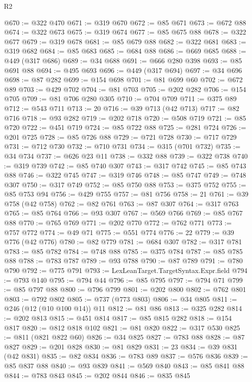\begin{lexlean}{R2}
\begin{coremodule}
@670 := @322 @470
@671 := @319 @670
@672 := @85 @671
@673 := @672 @88
@674 := @322 @673
@675 := @319 @674
@677 := @85 @675 @88
@678 := @322 @677
@679 := @319 @678
@681 := @85 @679 @88
@682 := @322 @681
@683 := @319 @682
@684 := @85 @683
@685 := @684 @88
@686 := @669 @685
@688 := @449 (@317 @686)
@689 := @34 @688
@691 := @666 @280 @398
@693 := @85 @691 @88
@694 := @495 @693
@696 := @449 (@317 @694)
@697 := @34 @696
@698 := @87 @282
@699 := @154 @698
@701 := @81 @699 @60
@702 := @672 @89
@703 := @429 @702
@704 := @81 @703
@705 := @202 @282
@706 := @154 @705
@709 := @81 @706 @280 @305
@710 := @704 @709
@711 := @375 @89
@712 := @543 @711
@713 := 20
@716 := @39 @713 (@42 @713)
@717 := @82 @716
@718 := @93 @282
@719 := @202 @718
@720 := @508 @719
@721 := @85 @720
@722 := @451 @719
@724 := @85 @722 @88
@725 := @281 @724
@726 := @201 @725
@728 := @85 @726 @88
@729 := @721 @728
@730 := @717 @729
@731 := @712 @730
@732 := @710 @731
@734 := @315 (@701 @732)
@735 := @34 @734
@737 := @626 @23 @11
@738 := @332 @88
@739 := @322 @738
@740 := @319 @739
@742 := @85 @740 @307
@743 := @317 @742
@745 := @85 @743 @88
@746 := @322 @745
@747 := @319 @746
@748 := @85 @747
@749 := @748 @307
@750 := @317 @749
@752 := @85 @750 @88
@753 := @375 @752
@755 := @85 @753 @94
@756 := @429 @755
@757 := @81 @756
@758 := 21
@761 := @39 @758 (@42 @758)
@762 := @82 @761
@763 := @87 @307
@764 := @317 @763
@765 := @85 @764
@766 := @93 @307
@767 := @569 @766
@769 := @85 @767 @88
@770 := @765 @769
@771 := @202 @770
@772 := @762 @771
@773 := @757 @772
@774 := @49 @71
@775 := @551 @774
@776 := 22
@779 := @39 @776 (@42 @776)
@780 := @82 @779
@781 := @684 @307
@782 := @317 @781
@783 := @85 @782
@784 := @748 @88
@785 := @375 @784
@787 := @85 @785 @88
@788 := @783 @787
@789 := @93 @788
@790 := @87 @789
@791 := @780 @790
@792 := @775 @791
@793 := LexLeanTarget.TargetSyntax.Expr.field
@794 := @793 @140
@795 := @794 @44
@796 := @85 @795
@797 := @794 @71
@799 := @85 @797 @88
@800 := @796 @799
@801 := @202 @800
@802 := @762 @801
@803 := @792 @802
@805 := @737 (@773 @803)
@806 := @34 @805
@811 := @246 (@12 (@10 @100 @14)) @11
@812 := @81 @86
@813 := @325 @282
@814 := @202 @813
@815 := @451 @814
@817 := @85 @815 @282
@818 := @154 @817
@820 := @812 @818 @102
@821 := @81 @820
@822 := @317 @530
@825 := @811 (@821 @822 @60)
@826 := @34 @825
@827 := @783 @88
@828 := @87 @827
@829 := @201 @828
@830 := @81 @829
@831 := 23
@834 := @39 @831 (@42 @831)
@835 := @82 @834
@836 := @783 @89
@837 := @576 @836
@839 := @85 @837 @88
@840 := @93 @839
@841 := @569 @840
@843 := @85 @841 @88
@844 := @783 @843
@845 := @202 @844
@846 := @835 @845

\end{coremodule}
\end{lexlean}
